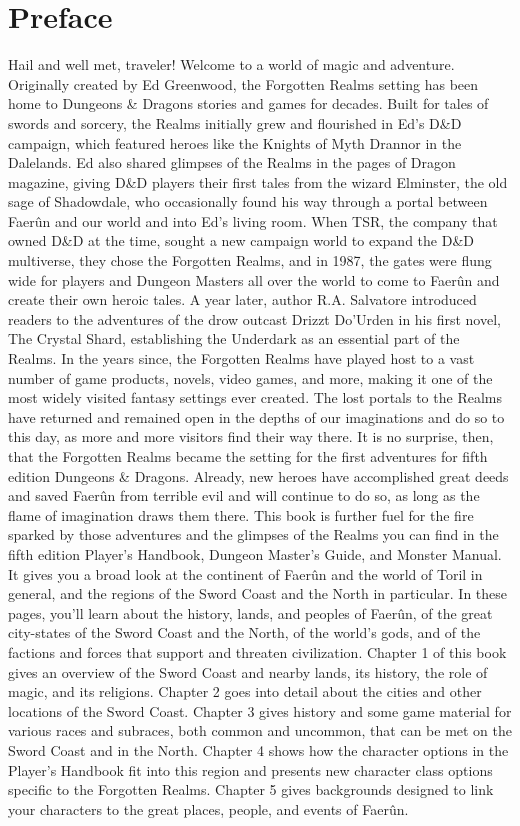 \documentclass[10pt,a4paper,twoside,twocolumn,openany,bg=print,nodeprecatedcode]{dndbook}
\begin{document}
\tableofcontents
\newpage
\chapter{Preface}
Hail and well met, traveler! Welcome to a world of magic and adventure. Originally created by Ed Greenwood, the Forgotten Realms setting has been home to Dungeons \& Dragons stories and games for decades. Built for tales of swords and sorcery, the Realms initially grew and flourished in Ed's D\&D campaign, which featured heroes like the Knights of Myth Drannor in the Dalelands. Ed also shared glimpses of the Realms in the pages of Dragon magazine, giving D\&D players their first tales from the wizard Elminster, the old sage of Shadowdale, who occasionally found his way through a portal between Faerûn and our world and into Ed's living room.
When TSR, the company that owned D\&D at the time, sought a new campaign world to expand the D\&D multiverse, they chose the Forgotten Realms, and in 1987, the gates were flung wide for players and Dungeon Masters all over the world to come to Faerûn and create their own heroic tales. A year later, author R.A. Salvatore introduced readers to the adventures of the drow outcast Drizzt Do'Urden in his first novel, The Crystal Shard, establishing the Underdark as an essential part of the Realms.
In the years since, the Forgotten Realms have played host to a vast number of game products, novels, video games, and more, making it one of the most widely visited fantasy settings ever created. The lost portals to the Realms have returned and remained open in the depths of our imaginations and do so to this day, as more and more visitors find their way there.
It is no surprise, then, that the Forgotten Realms became the setting for the first adventures for fifth edition Dungeons \& Dragons. Already, new heroes have accomplished great deeds and saved Faerûn from terrible evil and will continue to do so, as long as the flame of imagination draws them there.
This book is further fuel for the fire sparked by those adventures and the glimpses of the Realms you can find in the fifth edition Player's Handbook, Dungeon Master's Guide, and Monster Manual. It gives you a broad look at the continent of Faerûn and the world of Toril in general, and the regions of the Sword Coast and the North in particular.
In these pages, you'll learn about the history, lands, and peoples of Faerûn, of the great city-states of the Sword Coast and the North, of the world's gods, and of the factions and forces that support and threaten civilization. Chapter 1 of this book gives an overview of the Sword Coast and nearby lands, its history, the role of magic, and its religions. Chapter 2 goes into detail about the cities and other locations of the Sword Coast. Chapter 3 gives history and some game material for various races and subraces, both common and uncommon, that can be met on the Sword Coast and in the North. Chapter 4 shows how the character options in the Player's Handbook fit into this region and presents new character class options specific to the Forgotten Realms. Chapter 5 gives backgrounds designed to link your characters to the great places, people, and events of Faerûn.
\end{document}
